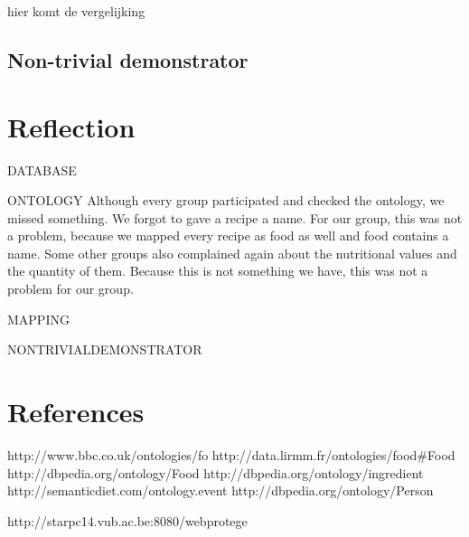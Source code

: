hier komt de vergelijking
\subsection{Non-trivial demonstrator}

\section{Reflection}
DATABASE

ONTOLOGY
Although every group participated and checked the ontology, we missed something. We forgot to gave a recipe a name. For our group, this was not a problem, because we mapped every recipe as food as well and food contains a name. Some other groups also complained again about the nutritional values and the quantity of them. Because this is not something we have, this was not a problem for our group. 

MAPPING

NONTRIVIALDEMONSTRATOR


\section*{References}
http://www.bbc.co.uk/ontologies/fo\newline
http://data.lirmm.fr/ontologies/food\#Food\newline
http://dbpedia.org/ontology/Food \newline
http://dbpedia.org/ontology/ingredient\newline
http://semanticdiet.com/ontology.event \newline
http://dbpedia.org/ontology/Person \newline


http://starpc14.vub.ac.be:8080/webprotege

